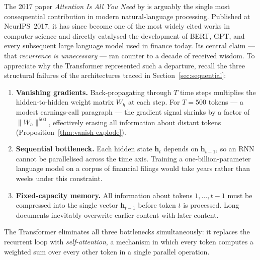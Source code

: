 \begin{deepdive}

The 2017 paper \emph{Attention Is All You Need} by \citet{vaswani2017attention}
is arguably the single most consequential contribution in modern natural-language
processing.
Published at NeurIPS~2017, it has since become one of the most widely cited works in computer science
and directly catalysed the development of BERT, GPT, and every subsequent large
language model used in finance today.
Its central claim — that \emph{recurrence is unnecessary} — ran counter to a decade
of received wisdom.
To appreciate why the Transformer represented such a departure, recall the three
structural failures of the architectures traced in Section~\ref{sec:sequential}:
\begin{enumerate}
  \item \textbf{Vanishing gradients.}  Back-propagating through $T$ time steps
    multiplies the hidden-to-hidden weight matrix $W_h$ at each step.
    For $T = 500$ tokens --- a modest earnings-call paragraph --- the gradient
    signal shrinks by a factor of $\|W_h\|^{500}$, effectively erasing all
    information about distant tokens (Proposition~\ref{thm:vanish-explode}).
  \item \textbf{Sequential bottleneck.}  Each hidden state $\mathbf{h}_t$ depends
    on $\mathbf{h}_{t-1}$, so an RNN cannot be parallelised across the time axis.
    Training a one-billion-parameter language model on a corpus of financial filings
    would take years rather than weeks under this constraint.
  \item \textbf{Fixed-capacity memory.}  All information about tokens
    $1,\ldots,t-1$ must be compressed into the single vector $\mathbf{h}_{t-1}$
    before token $t$ is processed.
    Long documents inevitably overwrite earlier content with later content.
\end{enumerate}
The Transformer eliminates all three bottlenecks simultaneously: it replaces the
recurrent loop with \emph{self-attention}, a mechanism in which every token
computes a weighted sum over every other token in a single parallel operation.


\end{deepdive}
